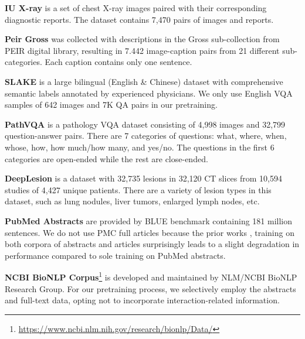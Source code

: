 \documentclass[10pt]{article} \usepackage[preprint]{tmlr}
\begin{document}
\noindent \textbf{IU X-ray} \citep{demner2016preparing} is a set of chest X-ray images paired with their corresponding diagnostic reports. The dataset contains 7,470 pairs of images and reports.
\vspace{5pt}

\noindent \textbf{Peir Gross} \citep{jing2018automatic} was collected with descriptions in the Gross sub-collection from PEIR digital library, resulting in 7.442 image-caption pairs from 21 different sub-categories. Each caption contains only one sentence.
\vspace{5pt}

\noindent \textbf{SLAKE} \citep{liu2021slake} is a large bilingual (English \& Chinese) dataset with comprehensive semantic labels annotated by experienced physicians. We only use English VQA samples of 642 images and 7K QA pairs in our pretraining. 
\vspace{5pt}

\noindent \textbf{PathVQA} \citep{he2020pathvqa} is a pathology VQA dataset consisting of 4,998 images and 32,799 question-answer pairs. There are 7 categories of questions: what, where, when, whose, how, how much/how many, and yes/no. The questions in the first 6 categories are open-ended while the rest are close-ended. 
\vspace{5pt}



\noindent \textbf{DeepLesion} \citep{yan2018deeplesion}  is a dataset with 32,735 lesions in 32,120 CT slices from 10,594 studies of 4,427 unique patients. There are a variety of lesion types in this dataset, such as lung nodules, liver tumors, enlarged lymph nodes, etc.
\vspace{5pt}

\noindent \textbf{PubMed Abstracts} are provided by BLUE benchmark \citep{peng2019transfer} containing 181 million sentences. We do not use PMC full articles because the prior works \citep{gu2021domain}, training on both corpora of abstracts and articles surprisingly leads to a slight degradation in performance compared to sole training on PubMed abstracts.
\vspace{5pt}

\noindent \textbf{NCBI BioNLP Corpus}\footnote{\url{https://www.ncbi.nlm.nih.gov/research/bionlp/Data/}} is developed and maintained by NLM/NCBI BioNLP Research Group. For our pretraining process, we selectively employ the abstracts and full-text data, opting not to incorporate interaction-related information.
\vspace{5pt}
\end{document}
